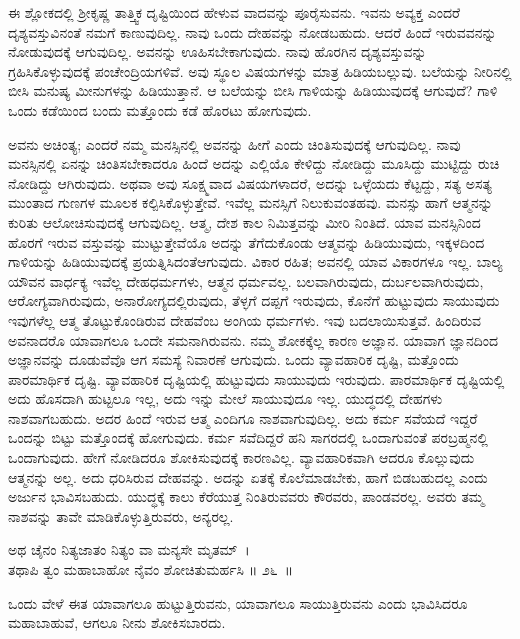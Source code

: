 ಈ ಶ್ಲೋಕದಲ್ಲಿ ಶ‍್ರೀಕೃಷ್ಣ ತಾತ್ತ್ವಿಕ ದೃಷ್ಟಿಯಿಂದ ಹೇಳುವ ವಾದವನ್ನು ಪೂರೈಸುವನು. ಇವನು ಅವ್ಯಕ್ತ ಎಂದರೆ ದೃಶ್ಯವಸ್ತುವಿನಂತೆ ನಮಗೆ ಕಾಣುವುದಿಲ್ಲ. ನಾವು ಒಂದು ದೇಹವನ್ನು ನೋಡಬಹುದು. ಆದರೆ ಹಿಂದೆ ಇರುವವನನ್ನು ನೋಡುವುದಕ್ಕೆ ಆಗುವುದಿಲ್ಲ. ಅವನನ್ನು ಊಹಿಸಬೇಕಾಗುವುದು. ನಾವು ಹೊರಗಿನ ದೃಶ್ಯವಸ್ತುವನ್ನು ಗ್ರಹಿಸಿಕೊಳ್ಳುವುದಕ್ಕೆ ಪಂಚೇಂದ್ರಿಯಗಳಿವೆ. ಅವು ಸ್ಥೂಲ ವಿಷಯಗಳನ್ನು ಮಾತ್ರ ಹಿಡಿಯಬಲ್ಲುವು. ಬಲೆಯನ್ನು ನೀರಿನಲ್ಲಿ ಬೀಸಿ ಮನುಷ್ಯ ಮೀನುಗಳನ್ನು ಹಿಡಿಯುತ್ತಾನೆ. ಆ ಬಲೆಯನ್ನು ಬೀಸಿ ಗಾಳಿಯನ್ನು ಹಿಡಿಯುವುದಕ್ಕೆ ಆಗುವುದೆ? ಗಾಳಿ ಒಂದು ಕಡೆಯಿಂದ ಬಂದು ಮತ್ತೊಂದು ಕಡೆ ಹೊರಟು ಹೋಗುವುದು.

ಅವನು ಅಚಿಂತ್ಯ; ಎಂದರೆ ನಮ್ಮ ಮನಸ್ಸಿನಲ್ಲಿ ಅವನನ್ನು ಹೀಗೆ ಎಂದು ಚಿಂತಿಸುವುದಕ್ಕೆ ಆಗುವುದಿಲ್ಲ. ನಾವು ಮನಸ್ಸಿನಲ್ಲಿ ಏನನ್ನು ಚಿಂತಿಸಬೇಕಾದರೂ ಹಿಂದೆ ಅದನ್ನು ಎಲ್ಲಿಯೊ ಕೇಳಿದ್ದು ನೋಡಿದ್ದು ಮೂಸಿದ್ದು ಮುಟ್ಟಿದ್ದು ರುಚಿ ನೋಡಿದ್ದು ಆಗಿರುವುದು. ಅಥವಾ ಅವು ಸೂಕ್ಷ್ಮವಾದ ವಿಷಯಗಳಾದರೆ, ಅದನ್ನು ಒಳ್ಳೆಯದು ಕೆಟ್ಟದ್ದು, ಸತ್ಯ ಅಸತ್ಯ ಮುಂತಾದ ಗುಣಗಳ ಮೂಲಕ ಕಲ್ಪಿಸಿಕೊಳ್ಳುತ್ತೇವೆ. ಇವೆಲ್ಲ ಮನಸ್ಸಿಗೆ ನಿಲುಕುವಂತಹವು. ಮನಸ್ಸು ಹಾಗೆ ಆತ್ಮನನ್ನು ಕುರಿತು ಆಲೋಚಿಸುವುದಕ್ಕೆ ಆಗುವುದಿಲ್ಲ. ಆತ್ಮ, ದೇಶ ಕಾಲ ನಿಮಿತ್ತವನ್ನು ಮೀರಿ ನಿಂತಿದೆ. ಯಾವ ಮನಸ್ಸಿನಿಂದ ಹೊರಗೆ ಇರುವ ವಸ್ತುವನ್ನು ಮುಟ್ಟುತ್ತೇವೆಯೊ ಅದನ್ನು ತೆಗೆದುಕೊಂಡು ಆತ್ಮವನ್ನು ಹಿಡಿಯುವುದು, ಇಕ್ಕಳದಿಂದ ಗಾಳಿಯನ್ನು ಹಿಡಿಯುವುದಕ್ಕೆ ಪ್ರಯತ್ನಿಸಿದಂತೆ\break ಆಗುವುದು. ವಿಕಾರ ರಹಿತ; ಅವನಲ್ಲಿ ಯಾವ ವಿಕಾರಗಳೂ ಇಲ್ಲ. ಬಾಲ್ಯ ಯೌವನ ವಾರ್ಧಕ್ಯ ಇವೆಲ್ಲ ದೇಹಧರ್ಮಗಳು, ಆತ್ಮನ ಧರ್ಮವಲ್ಲ. ಬಲವಾಗಿರುವುದು, ದುರ್ಬಲವಾಗಿರುವುದು, ಆರೋಗ್ಯವಾಗಿರುವುದು, ಅನಾರೋಗ್ಯದಲ್ಲಿರುವುದು, ತೆಳ್ಳಗೆ ದಪ್ಪಗೆ ಇರುವುದು, ಕೊನೆಗೆ ಹುಟ್ಟುವುದು ಸಾಯುವುದು ಇವುಗಳೆಲ್ಲ ಆತ್ಮ ತೊಟ್ಟುಕೊಂಡಿರುವ ದೇಹವೆಂಬ ಅಂಗಿಯ ಧರ್ಮಗಳು. ಇವು ಬದಲಾಯಿಸುತ್ತವೆ. ಹಿಂದಿರುವ ಅವನಾದರೊ ಯಾವಾಗಲೂ ಒಂದೇ ಸಮನಾಗಿರುವನು. ನಮ್ಮ ಶೋಕಕ್ಕೆಲ್ಲ ಕಾರಣ ಅಜ್ಞಾನ. ಯಾವಾಗ ಜ್ಞಾನದಿಂದ ಅಜ್ಞಾನವನ್ನು ದೂಡುವೆವೊ ಆಗ ಸಮಸ್ಯೆ ನಿವಾರಣೆ ಆಗುವುದು. ಒಂದು ವ್ಯಾವಹಾರಿಕ ದೃಷ್ಟಿ, ಮತ್ತೊಂದು ಪಾರಮಾರ್ಥಿಕ ದೃಷ್ಟಿ. ವ್ಯಾವಹಾರಿಕ ದೃಷ್ಟಿಯಲ್ಲಿ ಹುಟ್ಟುವುದು ಸಾಯುವುದು ಇರುವುದು. ಪಾರಮಾರ್ಥಿಕ ದೃಷ್ಟಿಯಲ್ಲಿ ಅದು ಹೊಸದಾಗಿ ಹುಟ್ಟಲೂ ಇಲ್ಲ, ಅದು ಇನ್ನು ಮೇಲೆ ಸಾಯುವುದೂ ಇಲ್ಲ. ಯುದ್ಧದಲ್ಲಿ ದೇಹಗಳು ನಾಶವಾಗಬಹುದು. ಅದರ ಹಿಂದೆ ಇರುವ ಆತ್ಮ ಎಂದಿಗೂ ನಾಶವಾಗುವುದಿಲ್ಲ. ಅದು ಕರ್ಮ ಸವೆಯದೆ ಇದ್ದರೆ ಒಂದನ್ನು ಬಿಟ್ಟು ಮತ್ತೊಂದಕ್ಕೆ ಹೋಗುವುದು. ಕರ್ಮ ಸವೆದಿದ್ದರೆ ಹನಿ ಸಾಗರದಲ್ಲಿ ಒಂದಾಗುವಂತೆ ಪರಬ್ರಹ್ಮನಲ್ಲಿ ಒಂದಾಗುವುದು. ಹೇಗೆ ನೋಡಿದರೂ ಶೋಕಿಸುವುದಕ್ಕೆ ಕಾರಣವಿಲ್ಲ. ವ್ಯಾವಹಾರಿಕವಾಗಿ ಆದರೂ ಕೊಲ್ಲುವುದು ಆತ್ಮನನ್ನು ಅಲ್ಲ. ಅದು ಧರಿಸಿರುವ ದೇಹವನ್ನು. ಅದನ್ನು ಏತಕ್ಕೆ ಕೊಲೆಮಾಡಬೇಕು, ಹಾಗೆ ಬಿಡಬಹುದಲ್ಲ ಎಂದು ಅರ್ಜುನ ಭಾವಿಸಬಹುದು. ಯುದ್ಧಕ್ಕೆ ಕಾಲು ಕೆರೆಯುತ್ತ ನಿಂತಿರುವವರು ಕೌರವರು, ಪಾಂಡವರಲ್ಲ. ಅವರು ತಮ್ಮ ನಾಶವನ್ನು ತಾವೇ ಮಾಡಿಕೊಳ್ಳುತ್ತಿರುವರು, ಅನ್ಯರಲ್ಲ.

\begin{shloka}
ಅಥ ಚೈನಂ ನಿತ್ಯಜಾತಂ ನಿತ್ಯಂ ವಾ ಮನ್ಯಸೇ ಮೃತಮ್~।\\ತಥಾಪಿ ತ್ವಂ ಮಹಾಬಾಹೋ ನೈವಂ ಶೋಚಿತುಮರ್ಹಸಿ \hfill॥ ೨೬~॥
\end{shloka}

\begin{artha}
ಒಂದು ವೇಳೆ ಈತ ಯಾವಾಗಲೂ ಹುಟ್ಟುತ್ತಿರುವನು, ಯಾವಾಗಲೂ ಸಾಯುತ್ತಿರುವನು ಎಂದು ಭಾವಿಸಿದರೂ ಮಹಾಬಾಹುವೆ, ಆಗಲೂ ನೀನು ಶೋಕಿಸಬಾರದು.
\end{artha}

